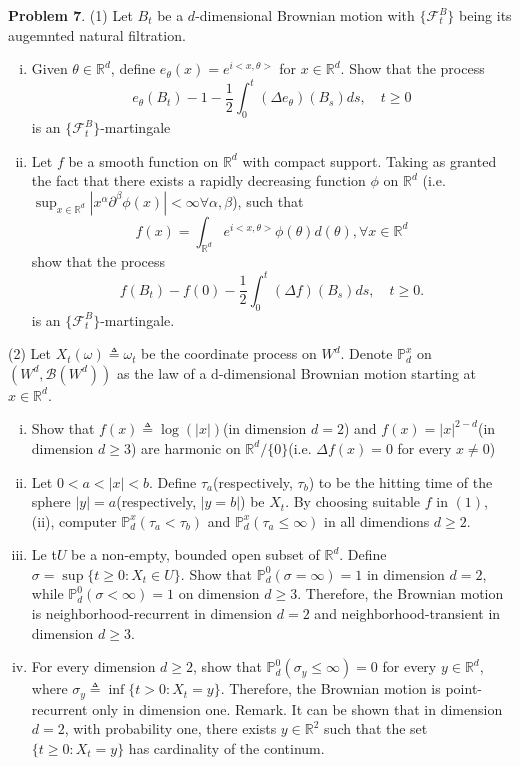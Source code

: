 \documentclass{article}     %
\begin{document}
\noindent
\textbf{Problem 7}. (1) Let $B_t$ be a $d$-dimensional Brownian motion with $\{\mathcal{F}_t^B\}$ being its augemnted natural filtration.
\begin{enumerate}[(i)]
    \item Given $\theta \in \mathbb{R}^d$, define $e_{\theta}(x)=e^{i<x,\theta>}$ for $x\in \mathbb{R}^d$. Show that the process
    \[e_{\theta}(B_t)-1-\frac{1}{2}\int_0^t(\Delta e_{\theta})(B_s)ds,\quad t\geq 0\]
    is an $\{\mathcal{F}_t^B\}$-martingale
    \item Let $f$ be a smooth function on $\mathbb{R}^d$ with compact support. Taking as granted the fact that there exists a rapidly decreasing function $\phi$ on $\mathbb{R}^d$ (i.e. $\sup_{x\in \mathbb{R}^d}|x^{\alpha}{\partial}^{\beta}\phi(x)|< \infty \forall \alpha,\beta$), such that 
    \[f(x)=\int_{\mathbb{R}^d} e^{i<x,\theta>}\phi(\theta)d(\theta), \forall x\in \mathbb{R}^d\]
    show that the process 
    \[f(B_t)-f(0)-\frac{1}{2}\int_0^t(\Delta f)(B_s)ds, \quad t\geq 0.\]
    is an $\{\mathcal{F}_t^B\}$-martingale.
\end{enumerate}
(2) Let $X_t(\omega)\triangleq \omega_t$ be the coordinate process on $W^d$. Denote $\mathbb{P}_d^x$ on $(W^d,\mathcal{B}(W^d))$ as the law of a d-dimensional Brownian motion starting at $x\in \mathbb{R}^d$. 
\begin{enumerate}[(i)]
    \item Show that $f(x)\triangleq \log(|x|)$(in dimension $d=2$) and $f(x)=|x|^{2-d}$(in dimension $d\geq 3$) are harmonic on $\mathbb{R}^d/\{0\}$(i.e. $\Delta f(x)=0$ for every $x\neq 0$)
    \item Let $0<a <|x|<b$. Define $\tau_a$(respectively, $\tau_b$) to be the hitting time of the sphere $|y|=a$(respectively, $|y=b|$) be $X_t$. By choosing suitable $f$ in $(1)$, (ii), computer $\mathbb{P}^x_d(\tau_a<\tau_b)$ and $\mathbb{P}^x_d(\tau_a\leq \infty)$ in all dimendions $d\geq 2$.
    \item Le t$U$ be a non-empty, bounded open subset of $\mathbb{R}^d$. Define $\sigma=\sup\{t\geq 0:X_t\in U\}$. Show that $\mathbb{P}_d^0(\sigma=\infty)=1$ in dimension $d=2$, while $\mathbb{P}_d^0(\sigma<\infty)=1$ on dimension $d\geq 3$. Therefore, the Brownian motion is neighborhood-recurrent in dimension $d=2$ and neighborhood-transient in dimension $d\geq 3$.
    \item For every dimension $d\geq 2$, show that $\mathbb{P}_d^0 (\sigma_y\leq \infty)=0$ for every $y\in \mathbb{R}^d$, where $\sigma_y\triangleq \inf\{t>0:X_t=y\}$. Therefore, the Brownian motion is point-recurrent only in dimension one.
    Remark. It can be shown that in dimension $d=2$, with probability one, there exists $y\in \mathbb{R}^2$ such that the set $\{t\geq 0:X_t=y\}$ has cardinality of the continum.
\end{enumerate}
\end{document}

